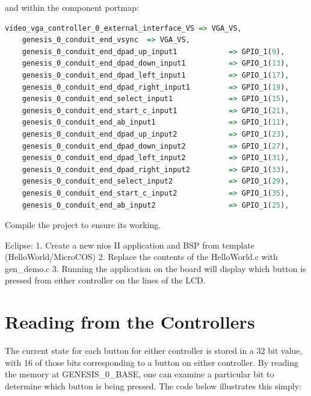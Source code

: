 \documentclass{capstonedoc}
\begin{document}
and within the component portmap:
\begin{lstlisting}[language={vhdl},float]
	video_vga_controller_0_external_interface_VS => VGA_VS,
	genesis_0_conduit_end_vsync  => VGA_VS,
	genesis_0_conduit_end_dpad_up_input1            => GPIO_1(9),            --.dpad_up_input1
	genesis_0_conduit_end_dpad_down_input1          => GPIO_1(13),            --.dpad_down_input1
	genesis_0_conduit_end_dpad_left_input1          => GPIO_1(17),            --.dpad_left_input1
	genesis_0_conduit_end_dpad_right_input1         => GPIO_1(19),            --.dpad_right_input1
	genesis_0_conduit_end_select_input1             => GPIO_1(15),            --.select_input1
	genesis_0_conduit_end_start_c_input1            => GPIO_1(21),            --.start_c_input1
	genesis_0_conduit_end_ab_input1                 => GPIO_1(11),            -- .ab_input1
	genesis_0_conduit_end_dpad_up_input2            => GPIO_1(23),            --.dpad_up_input2
	genesis_0_conduit_end_dpad_down_input2          => GPIO_1(27),            --.dpad_down_input2
	genesis_0_conduit_end_dpad_left_input2          => GPIO_1(31),            --.dpad_left_input2
	genesis_0_conduit_end_dpad_right_input2         => GPIO_1(33),            --.dpad_right_input2
	genesis_0_conduit_end_select_input2             => GPIO_1(29),            --.select_input2
	genesis_0_conduit_end_start_c_input2            => GPIO_1(35),            --.start_c_input2
	genesis_0_conduit_end_ab_input2                 => GPIO_1(25),            --
\end{lstlisting}

Compile the project to ensure its working. 

Eclipse: 
1. Create a new nios II application and BSP from template (HelloWorld/MicroCOS)
2. Replace the contents of the HelloWorld.c with gen_demo.c
3. Running the application on the board will display which button 
is pressed from either controller on the lines of the LCD.

\section{Reading from the Controllers}
The current state for each button for either controller is stored 
in a 32 bit value, with 16 of those bits corresponding to a button 
on either controller. By reading the memory at GENESIS_0_BASE, 
one can examine a particular bit to determine which button is being 
pressed. The code below illustrates this simply: 
\end{document}
